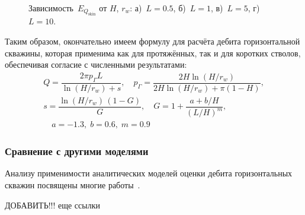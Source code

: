 \documentclass{article}
\begin{document}
\begin{figure}[H]
	\centering
	\begin{subfigure}{0.48\textwidth}
		
		\caption{}
		\label{fig:kham_hw_pipe_edge_effect_L0.5_r_approx}
	\end{subfigure}
	\hfill
	\begin{subfigure}{0.48\textwidth}
		
		\caption{}
		\label{fig:kham_hw_pipe_edge_effect_L1_r_approx}
	\end{subfigure}

	\begin{subfigure}{0.48\textwidth}
		
		\caption{}
		\label{fig:kham_hw_pipe_edge_effect_L5_r_approx}
	\end{subfigure}
	\hfill
	\begin{subfigure}{0.48\textwidth}
		
		\caption{}
		\label{fig:kham_hw_pipe_edge_effect_L10_r_approx}
	\end{subfigure}

	\caption{
		Зависимость~$E_{Q_{\text{skin}}}$ от $H$, $r_w$: а)~$L=0.5$, б)~$L=1$, в)~$L=5$, г)~$L=10$.
	}
	\label{fig:kham_hw_pipe_edge_effects_r_approx}
\end{figure}

Таким образом, окончательно имеем формулу для расчёта дебита горизонтальной скважины,
которая применима как для протяжённых, так и для коротких стволов, обеспечивая согласие с численными результатами:
\begin{equation}
	\displaystyle
	\begin{gathered}
		Q = \dfrac{2 \pi p_{\Gamma} L}{\ln \left( H / r_w \right) + s}, \quad
		p_{\Gamma} = \dfrac{2 H \ln{\left(H/r_w\right)}}{2 H \ln{\left(H/r_w\right)
				+ \pi \left(1 - H\right)}}, \\[6pt] %
		s = \dfrac{\ln \left( H / r_w \right)\,\left(1 - G\right)}{G}, \quad
		G = 1 + \dfrac{a + b/H}{\left(L/H\right)^{m}}, \\ %
		\quad a=-1.3,\; b=0.6,\; m=0.9
	\end{gathered}
	\label{eq:hw_final_Q}
\end{equation}

\subsubsection{Сравнение с другими моделями}
Анализу применимости аналитических моделей оценки дебита горизонтальных скважин посвящены многие
работы~\cite{lit:kham_shubin2018,lit:kham_nasybullin2023}.
\begin{tcolorbox}[colback=yellow!20, colframe=black, coltitle=black, colbacktitle=yellow, title=\textbf{Предупреждение}]
	ДОБАВИТЬ!!! еще ссылки
\end{tcolorbox}
\end{document}
